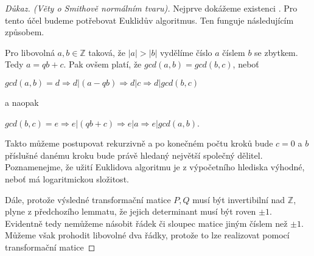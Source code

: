 \begin{proof}[Důkaz. (Věty o Smithově normálním tvaru)]
Nejprve dokážeme existenci \snf{}. Pro tento účel budeme potřebovat Euklidův
algoritmus. Ten funguje následujícím způsobem.

Pro libovolná $ a, b \in \mathbb{Z}$ taková, že $ |a| > |b| $ vydělíme číslo
$ a $ číslem $ b $ se zbytkem. Tedy $ a = qb + c $. Pak ovšem platí, že
$ gcd(a, b) = gcd(b, c) $, neboť

\begin{center}
$ gcd(a, b) = d \Rightarrow d \vert (a - qb) \Rightarrow d \vert c \Rightarrow d \vert gcd(b, c)$
\end{center}
a naopak
\begin{center}
$ gcd(b, c) = e \Rightarrow e \vert (qb + c) \Rightarrow e \vert a \Rightarrow e \vert gcd(a, b)$.
\end{center}
Takto můžeme postupovat rekurzivně a po konečném počtu kroků bude $ c = 0 $ a
$ b $ příslušné danému kroku bude právě hledaný největší společný dělitel.
Poznamenejme, že užití Euklidova algoritmu je z výpočetního hlediska výhodné, neboť
má logaritmickou složitost.

Dále, protože výsledné transformační matice $ P, Q $ musí být invertibilní nad $\mathbb{Z}$,
plyne z předchozího lemmatu, že jejich determinant musí být roven $ \pm 1 $.
Evidentně tedy nemůžeme násobit řádek či sloupec matice jiným číslem než $ \pm 1 $.
Můžeme však prohodit libovolné dva řádky, protože to lze realizovat pomocí
transformační matice


\end{proof}
